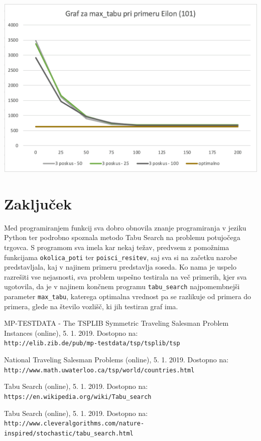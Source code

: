 \documentclass[10pt, a4paper]{article}
\begin{document}
\begin{center}
\includegraphics[scale=0.3]{graf}
\end{center}




\section{Zaključek}

Med programiranjem funkcij sva dobro obnovila znanje programiranja v jeziku Python ter podrobno spoznala metodo Tabu Search na problemu potujočega trgovca. S programom sva imela kar nekaj težav, predvsem z pomožnima funkcijama \texttt{okolica\_poti} ter \texttt{poisci\_resitev}, saj sva si na začetku narobe predstavljala, kaj v najinem primeru predstavlja soseda. Ko nama je uspelo razrešiti vse nejasnosti, sva problem uspešno testirala na več primerih, kjer sva ugotovila, da je v najinem končnem programu \texttt{tabu\_search} najpomembnejši parameter \texttt{max\_tabu}, katerega optimalna vrednost pa se razlikuje od primera do primera, glede na število vozlišč, ki jih testiran graf ima.





\begin{thebibliography}{4}
MP-TESTDATA - The TSPLIB Symmetric Traveling Salesman Problem Instances (online), 5. 1. 2019. Dostopno na:
\\\texttt{http://elib.zib.de/pub/mp-testdata/tsp/tsplib/tsp}

National Traveling Salesman Problems (online), 5. 1. 2019. Dostopno na:
\\\texttt{http://www.math.uwaterloo.ca/tsp/world/countries.html}

Tabu Search (online), 5. 1. 2019. Dostopno na:
\\\texttt{https://en.wikipedia.org/wiki/Tabu\_search}

Tabu Search (online), 5. 1. 2019. Dostopno na:
\\\texttt{http://www.cleveralgorithms.com/nature-inspired/stochastic/tabu\_search.html}
\end{thebibliography}
\end{document}
